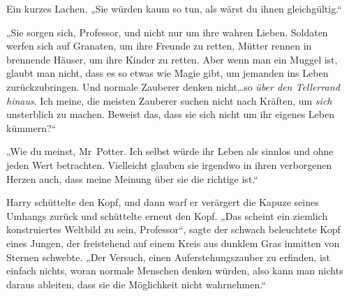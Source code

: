 Ein kurzes Lachen.
„Sie würden kaum so tun, als wärst du ihnen gleichgültig.“

„Sie sorgen sich, Professor, und nicht nur um ihre wahren Lieben. Soldaten werfen sich auf Granaten, um ihre Freunde zu retten, Mütter rennen in brennende Häuser, um ihre Kinder zu retten. Aber wenn man ein Muggel ist, glaubt man nicht, dass es so etwas wie Magie gibt, um jemanden ins Leben zurückzubringen. Und normale Zauberer denken nicht…so \emph{über den Tellerrand hinaus}. Ich meine, die meisten Zauberer suchen nicht nach Kräften, um \emph{sich} unsterblich zu machen. Beweist das, dass sie sich nicht um ihr eigenes Leben kümmern?“

„Wie du meinst, Mr~Potter. Ich selbst würde ihr Leben als sinnlos und ohne jeden Wert betrachten. Vielleicht glauben sie irgendwo in ihren verborgenen Herzen auch, dass meine Meinung über sie die richtige ist.“

Harry schüttelte den Kopf, und dann warf er verärgert die Kapuze seines Umhangs zurück und schüttelte erneut den Kopf. „Das scheint ein ziemlich konstruiertes Weltbild zu sein, Professor“, sagte der schwach beleuchtete Kopf eines Jungen, der freistehend auf einem Kreis aus dunklem Gras inmitten von Sternen schwebte. „Der Versuch, einen Auferstehungszauber zu erfinden, ist einfach nichts, woran normale Menschen denken würden, also kann man nichts daraus ableiten, dass sie die Möglichkeit nicht wahrnehmen.“

